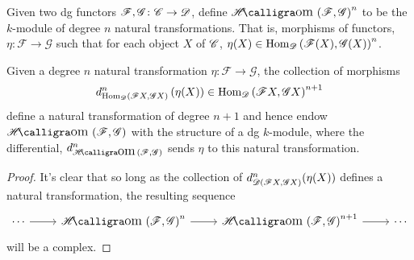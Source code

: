 \documentclass[dissertation.tex]{subfiles}
\begin{document}
        \begin{defn}
          Given two dg functors $\mathscr{F},\mathscr{G} \colon \mathscr{C} \rightarrow \mathscr{D}$, define $\SHom{\mathscr{F},\mathscr{G}}^n$ to be the $k$-module of degree $n$ natural transformations.
          That is, morphisms of functors, $\eta \colon \mathscr{F} \rightarrow \mathscr{G}$ such that for each object $X$ of $\mathscr{C}$, $\eta(X) \in \operatorname{Hom}_{\mathscr{D}}\left(\mathscr{F}(X),\mathscr{G}(X)\right)^n$.
        \end{defn}

        \begin{prop}
          Given a degree $n$ natural transformation $\eta \colon \mathscr{F} \rightarrow \mathscr{G}$, the collection of morphisms
          $$d^n_{\operatorname{Hom}_{\mathscr{D}}\left(\mathscr{F}X, \mathscr{G}X\right)}\left( \eta(X) \right) \in \operatorname{Hom}_{\mathscr{D}}\left(\mathscr{F}X, \mathscr{G}X\right)^{n+1}$$
          define a natural transformation of degree $n + 1$ and hence endow $\SHom{\mathscr{F},\mathscr{G}}$ with the structure of a dg $k$-module, where the differential, $d_{\SHom{\mathscr{F},\mathscr{G}}}^n$ sends $\eta$ to this natural transformation.
          
          \begin{proof}
            It's clear that so long as the collection of $d^n_{\mathscr{D}(\mathscr{F} X, \mathscr{G} X)}(\eta(X))$ defines a natural transformation, the resulting sequence
            $$\begin{tikzcd}
              \cdots \arrow{r} & \SHom{\F, \G}^n \arrow{r} & \SHom{\F,\G}^{n+1} \arrow{r} & \cdots
            \end{tikzcd}$$
            will be a complex.
            

\end{proof}
\end{prop}
\end{document}
